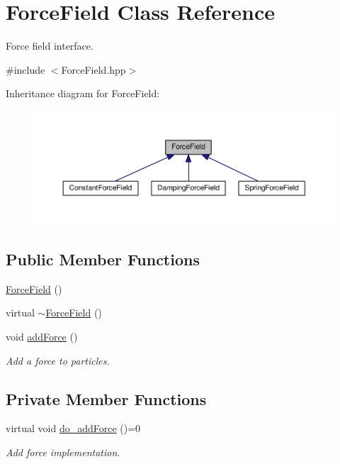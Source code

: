 \hypertarget{classForceField}{\section{Force\+Field Class Reference}
\label{classForceField}
}


Force field interface.  




{\ttfamily \#include $<$Force\+Field.\+hpp$>$}



Inheritance diagram for Force\+Field\+:\nopagebreak
\begin{figure}[H]
\begin{center}
\leavevmode
\includegraphics[width=350pt]{classForceField__inherit__graph}
\end{center}
\end{figure}
\subsection*{Public Member Functions}
\begin{DoxyCompactItemize}
\item 
\hyperlink{classForceField_a8273c2e8667bc21edb7599c1210dda4a}{Force\+Field} ()
\item 
virtual \hyperlink{classForceField_a718e3d630818c01519a99aa2088c0900}{$\sim$\+Force\+Field} ()
\item 
void \hyperlink{classForceField_acf0c3bb94b1a27adccab0835c49a47f1}{add\+Force} ()
\begin{DoxyCompactList}\small\item\em Add a force to particles. \end{DoxyCompactList}\end{DoxyCompactItemize}
\subsection*{Private Member Functions}
\begin{DoxyCompactItemize}
\item 
virtual void \hyperlink{classForceField_a2f44520a00188a3aaeb04e667e8d2673}{do\+\_\+add\+Force} ()=0
\begin{DoxyCompactList}\small\item\em Add force implementation. \end{DoxyCompactList}\end{DoxyCompactItemize}


